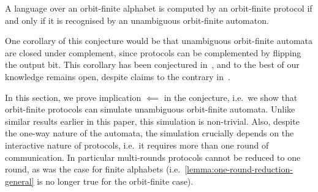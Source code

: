\begin{conjecture}
    \label{conj:protocols-unambiguous} A language over an orbit-finite alphabet is computed by an orbit-finite protocol if and only if it is recognised by an unambiguous orbit-finite automaton.
\end{conjecture}

One corollary of this conjecture would be that unambiguous orbit-finite automata are closed under complement, since protocols can be complemented by flipping the output bit. This corollary has been conjectured in~\cite[p.9]{colcombet2012forms}, and to the best of our knowledge remains open, despite claims to the contrary in~\cite[Footnote 5]{colcombet2015unambiguity}.

In this section, we prove implication $\impliedby$ in the conjecture, i.e.~we show that orbit-finite protocols can simulate  unambiguous orbit-finite automata. Unlike similar results earlier in this paper, this simulation is non-trivial. Also, despite the one-way nature of the automata, the simulation crucially depends on the interactive nature of protocols, i.e.~it requires more than one round of communication. In particular multi-rounds protocols cannot be reduced to one round, as was the case for finite alphabets
(i.e.~\cref{lemma:one-round-reduction-general} is no longer true for the orbit-finite case).

